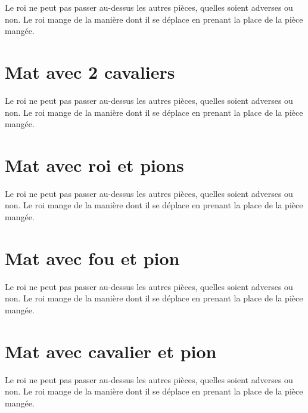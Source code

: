 \documentclass[a5paper,openany,twocolumn]{book}
\begin{document}
{Le roi ne peut pas passer au-dessus les autres pièces, quelles soient adverses ou non. Le roi mange de la manière dont il se déplace en prenant la place de la pièce mangée. 


\chapter{Mat avec 2 cavaliers}

Le roi ne peut pas passer au-dessus les autres pièces, quelles soient adverses ou non. Le roi mange de la manière dont il se déplace en prenant la place de la pièce mangée. 


\chapter{Mat avec roi et pions}
 
Le roi ne peut pas passer au-dessus les autres pièces, quelles soient adverses ou non. Le roi mange de la manière dont il se déplace en prenant la place de la pièce mangée. 


\chapter{Mat avec fou et pion}

Le roi ne peut pas passer au-dessus les autres pièces, quelles soient adverses ou non. Le roi mange de la manière dont il se déplace en prenant la place de la pièce mangée. 


\chapter{Mat avec cavalier et pion}

Le roi ne peut pas passer au-dessus les autres pièces, quelles soient adverses ou non. Le roi mange de la manière dont il se déplace en prenant la place de la pièce mangée. 

}
\end{document}
